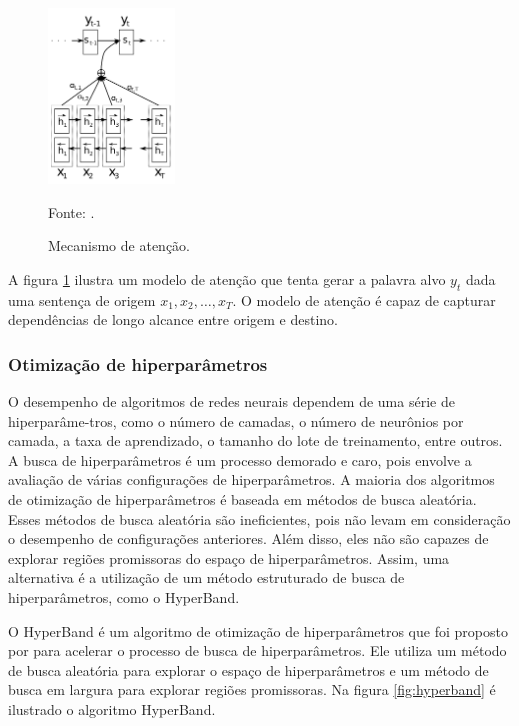             \begin{figure}[H]
                \centering
                \caption{Mecanismo de atenção.}
                \label{fig:attention}
                \includegraphics[width=0.3\textwidth]{imagens/attention.png}
                \par \footnotesize Fonte: .
            \end{figure}

            \ipar A figura \ref{fig:attention} ilustra um modelo de atenção que tenta gerar a palavra alvo $y_t$ dada uma sentença de origem $x_1, x_2, \dots, x_T$. O modelo de atenção é capaz de capturar dependências de longo alcance entre origem e destino.

        \subsubsection{Otimização de hiperparâmetros}

            \ipar O desempenho de algoritmos de redes neurais dependem de uma série de hiperparâme-tros, como o número de camadas, o número de neurônios por camada, a taxa de aprendizado, o tamanho do lote de treinamento, entre outros. A busca de hiperparâmetros é um processo demorado e caro, pois envolve a avaliação de várias configurações de hiperparâmetros. A maioria dos algoritmos de otimização de hiperparâmetros é baseada em métodos de busca aleatória. Esses métodos de busca aleatória são ineficientes, pois não levam em consideração o desempenho de configurações anteriores. Além disso, eles não são capazes de explorar regiões promissoras do espaço de hiperparâmetros. Assim, uma alternativa é a utilização de um método estruturado de busca de hiperparâmetros, como o HyperBand.

            \ipar O HyperBand é um algoritmo de otimização de hiperparâmetros que foi proposto por  para acelerar o processo de busca de hiperparâmetros. Ele utiliza um método de busca aleatória para explorar o espaço de hiperparâmetros e um método de busca em largura para explorar regiões promissoras. Na figura \ref{fig:hyperband} é ilustrado o algoritmo HyperBand.

